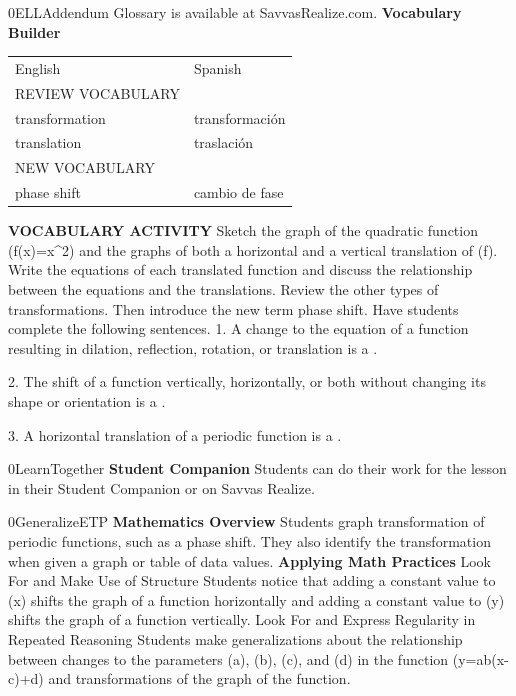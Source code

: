 \documentclass{article}
\newenvironment{te-addendum}[2]{}{}     %
\newcommand{\answer}[1]{}               %
\newcommand{\placeholder}[2]{}          %
\begin{document}
\begin{te-addendum}{0}{ELLAddendum}
Glossary is available at SavvasRealize.com.
\textbf{Vocabulary Builder}
\begin{tabular}{ll}
English & Spanish \\
REVIEW VOCABULARY & \\
transformation & transformación \\
translation & traslación \\
NEW VOCABULARY & \\
phase shift & cambio de fase \\
\end{tabular}
\textbf{VOCABULARY ACTIVITY}
Sketch the graph of the quadratic function (f(x)=x^2) and the graphs of both a horizontal and a vertical translation of (f). Write the equations of each translated function and discuss the relationship between the equations and the translations. Review the other types of transformations. Then introduce the new term phase shift. Have students complete the following sentences.
1. A change to the equation of a function resulting in dilation, reflection, rotation, or translation is a \underline{\hspace{1cm}}.
\answer{transformation}
2. The shift of a function vertically, horizontally, or both without changing its shape or orientation is a \underline{\hspace{1cm}}.
\answer{translation}
3. A horizontal translation of a periodic function is a \underline{\hspace{1cm}}.
\answer{phase shift}
\end{te-addendum}
\begin{te-addendum}{0}{LearnTogether}
\textbf{Student Companion}
Students can do their work for the lesson in their Student Companion or on Savvas Realize.
\placeholder{illustration}{Black Student Companion book cover, purple and blue circular abstract artwork, title enVision Algebra2, SAVVAS.}
\end{te-addendum}
\begin{te-addendum}{0}{GeneralizeETP}
\textbf{Mathematics Overview}
Students graph transformation of periodic functions, such as a phase shift. They also identify the transformation when given a graph or table of data values.
\textbf{Applying Math Practices}
Look For and Make Use of Structure
Students notice that adding a constant value to (x) shifts the graph of a function horizontally and adding a constant value to (y) shifts the graph of a function vertically.
Look For and Express Regularity in Repeated Reasoning
Students make generalizations about the relationship between changes to the parameters (a), (b), (c), and (d) in the function (y=a\sin b(x-c)+d) and transformations of the graph of the function.
\end{te-addendum}
\end{document}

